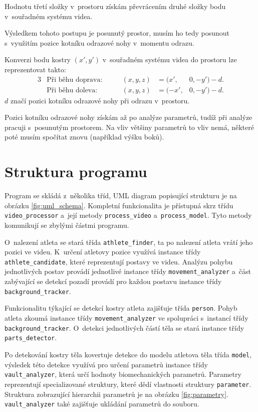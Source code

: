 Hodnotu třetí složky v~prostoru získám převrácením druhé složky bodu v~souřadném systému videa.

Výsledkem tohoto postupu je posunutý prostor, musím ho tedy posunout s~využitím pozice kotníku odrazové nohy v~momentu odrazu.

Konverzi bodu kostry $(x',y')$ v~souřadném systému videa do prostoru lze reprezentovat takto:
\begin{alignat*}{3}
&\text{Při běhu doprava:} &\qquad (x,y,z)&=(x',&0,-y')-d. \\
&\text{Při běhu doleva:} &\qquad (x,y,z)&=(-x',&0,-y')-d.
\end{alignat*}
$d$ značí pozici kotníku odrazové nohy při odrazu v~prostoru.

Pozici kotníku odrazové nohy získám až po analýze parametrů, tudíž při analýze pracuji s~posunutým prostorem. Na vliv většiny parametrů to vliv nemá, některé poté musím spočítat znovu (například výšku boků).




\section{Struktura programu}

Program se skládá z~několika tříd, UML diagram popisující strukturu je na obrázku \ref{fig:uml_schema}. Kompletní funkcionalita je přístupná skrz třídu \texttt{video\_processor} a~její metody \texttt{process\_video} a~\texttt{process\_model}. Tyto metody komunikují se zbylými částmi programu.

O~nalezení atleta se stará třída \texttt{athlete\_finder}, ta po nalezení atleta vrátí jeho pozici ve videu. K~určení atletovy pozice využívá instance třídy \texttt{athlete\_candidate}, které reprezentují postavy ve videu. Analýzu pohybu jednotlivých postav provádí jednotlivé instance třídy \texttt{movement\_analyzer} a~část zabývající se detekcí pozadí provádí pro každou postavu instance třídy \texttt{background\_tracker}.

Funkcionalitu týkající se detekcí kostry atleta zajišťuje třída \texttt{person}. Pohyb atleta zkoumá instance třídy \texttt{movement\_analyzer} ve spolupráci s~instancí třídy \texttt{background\_tracker}. O~detekci jednotlivých částí těla se stará instance třídy \texttt{parts\_detector}.

Po detekování kostry těla kovertuje detekce do modelu atletova těla třída \texttt{model}, výsledek této detekce využívá pro určení parametrů instance třídy \texttt{vault\_analyzer}, která určí hodnoty biomechanických parametrů. Parametry reprezentují specializované struktury, které dědí vlastnosti struktury \texttt{parameter}. Struktura zobrazující hierarchii parametrů je na obrázku \ref{fig:parametry}. \texttt{vault\_analyzer} také zajišťuje ukládání parametrů do souboru.

